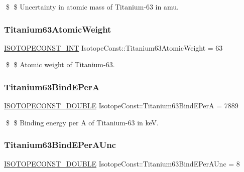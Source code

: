 \$ \$ Uncertainty in atomic mass of Titanium-\/63 in amu. \mbox{\label{group___isotope_const-_titanium-_ti63_ga81654bff0dc88f5010a5dbbb6c31c038}} 
\subsubsection{\texorpdfstring{Titanium63\+Atomic\+Weight}{Titanium63AtomicWeight}}
{\footnotesize\ttfamily \mbox{\hyperlink{group___isotope_const-_macros_ga5f18360b3e99483a35c32d789e62621c}{I\+S\+O\+T\+O\+P\+E\+C\+O\+N\+S\+T\+\_\+\+I\+NT}} Isotope\+Const\+::\+Titanium63\+Atomic\+Weight = 63}

\$ \$ Atomic weight of Titanium-\/63. \mbox{\label{group___isotope_const-_titanium-_ti63_ga61105bc00222c92d299c6b87c2a0841a}} 
\subsubsection{\texorpdfstring{Titanium63\+Bind\+E\+PerA}{Titanium63BindEPerA}}
{\footnotesize\ttfamily \mbox{\hyperlink{group___isotope_const-_macros_ga8f45a7272ce02c0b4c65c44636ed719a}{I\+S\+O\+T\+O\+P\+E\+C\+O\+N\+S\+T\+\_\+\+D\+O\+U\+B\+LE}} Isotope\+Const\+::\+Titanium63\+Bind\+E\+PerA = 7889}

\$ \$ Binding energy per A of Titanium-\/63 in keV. \mbox{\label{group___isotope_const-_titanium-_ti63_gabd36f72289dd5362be17b389bedeed7a}} 
\subsubsection{\texorpdfstring{Titanium63\+Bind\+E\+Per\+A\+Unc}{Titanium63BindEPerAUnc}}
{\footnotesize\ttfamily \mbox{\hyperlink{group___isotope_const-_macros_ga8f45a7272ce02c0b4c65c44636ed719a}{I\+S\+O\+T\+O\+P\+E\+C\+O\+N\+S\+T\+\_\+\+D\+O\+U\+B\+LE}} Isotope\+Const\+::\+Titanium63\+Bind\+E\+Per\+A\+Unc = 8}

